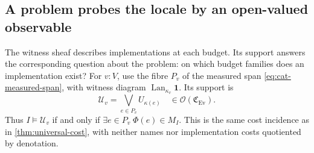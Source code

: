 \documentclass[11pt,a4paper]{article}
\numberwithin{algorithm}{section}
\numberwithin{equation}{section}
\theoremstyle{definition}
\theoremstyle{remark}
\theoremstyle{plain}
\newcommand{\OO}{\mathcal O}
\newcommand{\Lan}{\operatorname{Lan}}
\newcommand{\Ev}{{\operatorname{Ev}}}
\newcommand{\Cplx}{\mathfrak C_{\Ev}}
\theoremstyle{definition}
\theoremstyle{plain}
\begin{document}
\subsection{A problem probes the locale by an open-valued observable}
\label{app:complexity-feasibility-probes}

The witness sheaf describes implementations at each budget.
Its support answers the corresponding question about the problem:
on which budget families does an implementation exist?
For $v:V$, use the fibre $P_v$ of the measured span
\eqref{eq:cat-measured-span}, with witness diagram
$\Lan_{\kappa_v}\mathbf1$. Its support is
\begin{equation}\label{eq:app-problem-open}
 \mathcal U_v=\bigvee_{e\in P_v}U_{\kappa(e)}
 \quad\in\OO(\Cplx).
\end{equation}
Thus $I\models\mathcal U_v$ if and only if
$\exists e\in P_v\;\Phi(e)\in M_I$.  This is the same cost
incidence as in \cref{thm:universal-cost}, with neither names nor
implementation costs quotiented by denotation.
\end{document}
